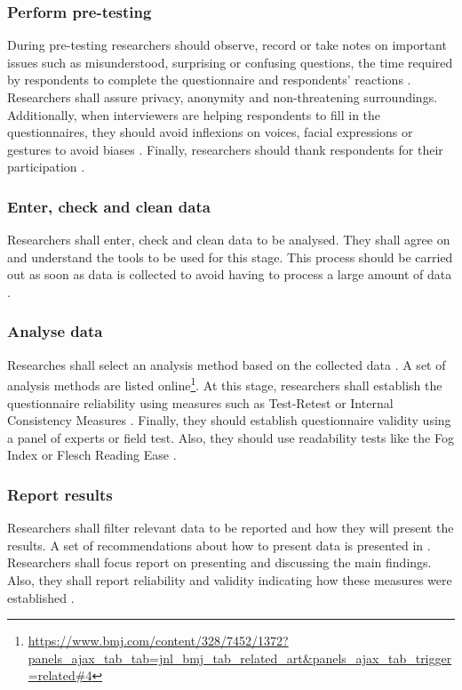 \subsubsection{Perform pre-testing}
During pre-testing researchers should observe, record or take notes on important issues such as misunderstood, surprising or confusing questions, the time required by respondents to complete the questionnaire and respondents' reactions \cite{Boynton2004}. Researchers shall assure privacy, anonymity and non-threatening surroundings. Additionally, when interviewers are helping respondents to fill in the questionnaires, they should avoid inflexions on voices, facial expressions or gestures to avoid biases \cite{Boynton2004b}.
Finally, researchers should thank respondents for their participation \cite{Diem}.

\subsubsection{Enter, check and clean data}
Researchers shall enter, check and clean data to be analysed. They shall agree on and understand the tools to be used for this stage. This process should be carried out as soon as data is collected to avoid having to process a large amount of data  \cite{Boynton2004}.

\subsubsection{Analyse data}
Researches shall select an analysis method based on the collected data \cite{Boynton2004,Diem}. A set of analysis methods are listed online\footnote{\url{https://www.bmj.com/content/328/7452/1372?panels_ajax_tab_tab=jnl_bmj_tab_related_art&panels_ajax_tab_trigger=related\#4}}. At this stage, researchers shall establish the questionnaire reliability using measures such as Test-Retest or Internal Consistency Measures \cite{Radhakrishna2007,Diem}. Finally, they should establish questionnaire validity using a panel of experts or field test. Also, they should use readability tests like the Fog Index or Flesch Reading Ease \cite{Radhakrishna2007}.

\subsubsection{Report results}
Researchers shall filter relevant data to be reported \cite{Boynton2004,Diem} and how they will present the results. A set of recommendations about how to present data is presented in \cite{Boynton2004}. Researchers shall focus report on presenting and discussing the main findings. Also, they shall report reliability and validity indicating how these measures were established \cite{Radhakrishna2007}.

